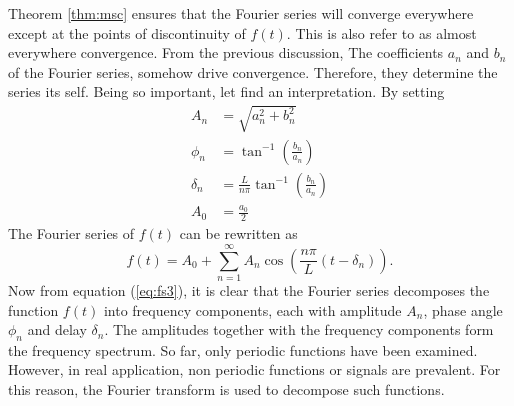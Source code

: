 \documentclass[../Main/thesis.tex]{subfiles}
\begin{document}
Theorem \ref{thm:msc} ensures that the Fourier series will converge everywhere except at the points of discontinuity of $f(t)$. This is also refer to as almost everywhere convergence.
\justify
From the previous discussion, The coefficients $a_{n}$ and $b_{n}$ of the Fourier series, somehow drive convergence. Therefore, they determine the series its self. Being so important, let find an interpretation. By setting
\begin{equation}
	\begin{split}
	A_{n} &= \sqrt{a_{n}^{2} + b_{n}^{2}}\\
	\phi_{n} & = \tan^{-1}\left( \frac{b_{n}}{a_{n}} \right)\\
	\delta_{n} &=\frac{L}{n\pi} \tan^{-1}\left(  \frac{b_{n}}{a_{n}}\right)\\
	A_{0} &= \frac{a_{0}}{2}
	\end{split}
\end{equation}
The Fourier series of $f(t)$ can be rewritten as 
\begin{equation}\label{eq:fs3}
	f(t) = A_{0} + \sum_{n=1}^{\infty}A_{n}\cos\left(  \frac{n\pi}{L}(t-\delta_{n})\right).
\end{equation}
Now from equation (\ref{eq:fs3}), it is clear that the Fourier series decomposes the function $f(t)$ into frequency components, each with amplitude $A_{n}$, phase angle $\phi_{n}$ and delay $\delta_{n}$. The amplitudes together with the frequency components form the frequency spectrum.
\justify
So far, only periodic functions have been examined. However, in real application, non periodic functions or signals are prevalent. For this reason, the Fourier transform is used to decompose such functions.
%
%
\end{document}
